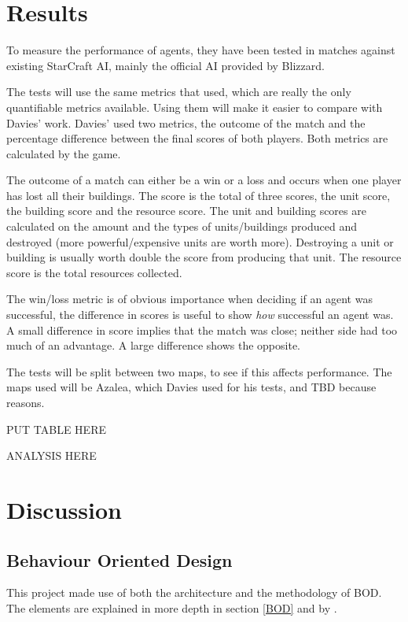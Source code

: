\documentclass[11pt,openright,a4paper]{report}
\begin{document}
\chapter{Results}
To measure the performance of agents, they have been tested in matches against existing StarCraft AI, mainly the official AI provided by Blizzard.

The tests will use the same metrics that  used, which are really the only quantifiable metrics available. Using them will make it easier to compare with Davies' work. Davies' used two metrics, the outcome of the match and the percentage difference between the final scores of both players. Both metrics are calculated by the game.

The outcome of a match can either be a win or a loss and occurs when one player has lost all their buildings. The score is the total of three scores, the unit score, the building score and the resource score. The unit and building scores are calculated on the amount and the types of units/buildings produced and destroyed (more powerful/expensive units are worth more). Destroying a unit or building is usually worth double the score from producing that unit. The resource score is the total resources collected.

The win/loss metric is of obvious importance when deciding if an agent was successful, the difference in scores is useful to show \textit{how} successful an agent was. A small difference in score implies that the match was close; neither side had too much of an advantage. A large difference shows the opposite.

The tests will be split between two maps, to see if this affects performance. The maps used will be Azalea, which Davies used for his tests, and TBD because reasons.

PUT TABLE HERE

ANALYSIS HERE  


\chapter{Discussion}


\section{Behaviour Oriented Design}
This project made use of both the architecture and the methodology of BOD. The elements are explained in more depth in section \ref{BOD} and by .
\end{document}
